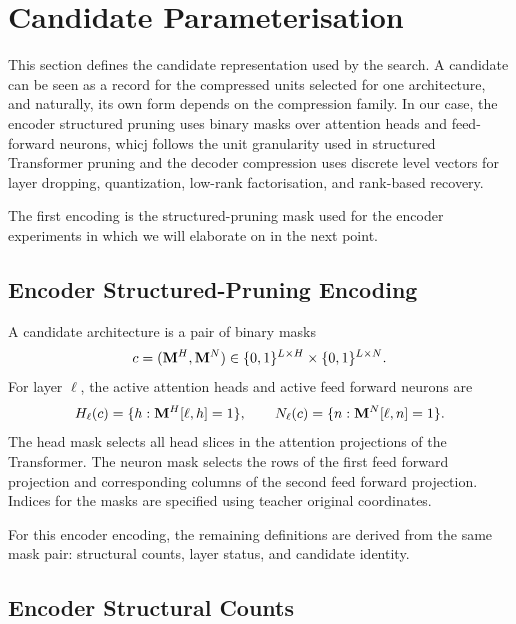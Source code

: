 \section{Candidate Parameterisation}
\label{chap:mask}

This section defines the candidate representation used by the search. A candidate can be seen as a record for the compressed units selected for one architecture, and naturally, its  own form depends on the compression family. In our case, the encoder structured pruning uses binary masks over attention heads and feed-forward neurons, whicj follows the unit granularity used in structured Transformer pruning \citep{michel2022not,xia2022cofi,kurtic2023ziplm} and the decoder compression uses discrete level vectors for layer dropping, quantization, low-rank factorisation, and rank-based recovery. 

The first encoding is the structured-pruning mask used for the encoder experiments in which we will elaborate on in the next point.

\subsection{Encoder Structured-Pruning Encoding}

A candidate architecture is a pair of binary masks
\begin{equation}
c = (\mathbf{M}^{H}, \mathbf{M}^{N})
\in
\{0,1\}^{L \times H}
\times
\{0,1\}^{L \times N}.
\end{equation}
For layer $\ell$, the active attention heads and active feed forward neurons are
\begin{equation}
H_\ell(c) = \{h : \mathbf{M}^{H}[\ell,h] = 1\},
\qquad
N_\ell(c) = \{n : \mathbf{M}^{N}[\ell,n] = 1\}.
\end{equation}
The head mask selects all head slices in the attention projections of the Transformer. The neuron mask selects the rows of the first feed forward projection and corresponding columns of the second feed forward projection. Indices for the masks are specified using teacher original coordinates.

For this encoder encoding, the remaining definitions are derived from the same mask pair: structural counts, layer status, and candidate identity.

\subsection{Encoder Structural Counts}

